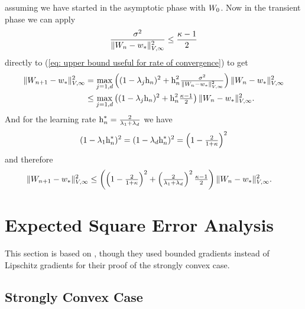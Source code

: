 assuming we have started in the asymptotic phase with \(W_0\). Now in the
transient phase we can apply
\begin{align*}
	\frac{\sigma^2}{
		\|W_n-w_*\|_{V,\infty}^2
	}
	\le \frac{\kappa-1}{2}
\end{align*}
directly to (\ref{eq: upper bound useful for rate of convergence}) to get
\begin{align*}
	\|W_{n+1}-w_*\|_{V,\infty}^2
	&= \max_{j=1,d}\left((1- \lambda_j\text{h}_n)^2
		+\text{h}_n^2\tfrac{\sigma^2}{\|W_n-w_*\|_{V,\infty}^2}
	\right)\|W_n-w_*\|_{V,\infty}^2\\
	&\le \max_{j=1,d}\left((1- \lambda_j\text{h}_n)^2
		+\text{h}_n^2\tfrac{\kappa-1}{2}
	\right)\|W_n-w_*\|_{V,\infty}^2.
\end{align*}
And for the learning rate \(\text{h}_n^*=\tfrac{2}{\lambda_1+\lambda_d}\)
we have
\begin{align*}
	(1-\lambda_1\text{h}_n^*)^2
	= (1-\lambda_d\text{h}_n^*)^2
	= \left(1-\tfrac{2}{1+\kappa}\right)^2
\end{align*}
and therefore
\begin{align*}
	\|W_{n+1}-w_*\|_{V,\infty}^2
	&\le \left(\left(1-\tfrac{2}{1+\kappa}\right)^2
		+\left(\tfrac{2}{\lambda_1+\lambda_d}\right)^2\tfrac{\kappa-1}{2}
	\right)\|W_n-w_*\|_{V,\infty}^2.
\end{align*}

\section{Expected Square Error Analysis}

This section is based on \textcite{nemirovskiRobustStochasticApproximation2009},
though they used bounded gradients instead of Lipschitz gradients for their
proof of the strongly convex case.

\subsection{Strongly Convex Case}

